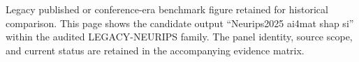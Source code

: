 Legacy published or conference-era benchmark figure retained for historical comparison. This page shows the candidate output ``Neurips2025 ai4mat shap si'' within the audited LEGACY-NEURIPS family. The panel identity, source scope, and current status are retained in the accompanying evidence matrix.

